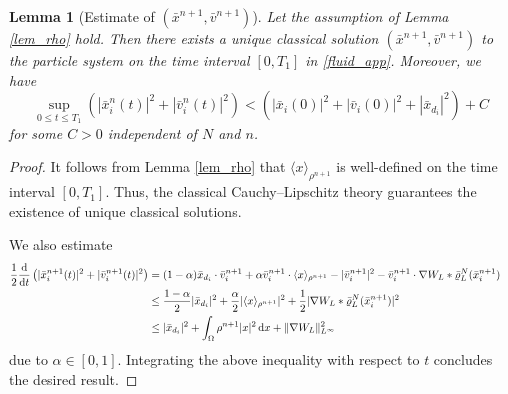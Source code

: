 \documentclass[10pt, reqno]{amsart}
\newtheorem{lemma}[theorem]{Lemma}
\theoremstyle{definition}
\theoremstyle{remark}
\numberwithin{equation}{section}
\newcommand{\dx}{\textnormal{d}x}
\newcommand{\ddt}{\frac{\textnormal{d}}{\textnormal{d}t}}
\newcommand{\calP}{\mathcal P}
\newcommand{\N}{\mathbb{N}}
\begin{document}
\begin{lemma}[Estimate of $(\bar x^{n+1}, \bar v^{n+1})$]\label{lem_par} Let the assumption of Lemma \ref{lem_rho} hold. Then there exists a unique classical solution $(\bar x^{n+1}, \bar v^{n+1})$ to the particle system on the time interval $[0,T_1]$ in \eqref{fluid_app}. Moreover, we have
\[
\sup_{0 \leq t \leq T_1} \left(| \bar x_i^n(t)|^2 + | \bar v_i^n(t)|^2 \right)  <  \left(| \bar x_i(0)|^2 + | \bar v_i(0)|^2 + |\bar{x}_{d_i}|^2 \right) + C
\]
for some $C>0$ independent of $N$ and $n$.
\end{lemma}
\begin{proof}It follows from Lemma \ref{lem_rho} that $\langle x \rangle_{\rho^{n+1}}$ is well-defined on the time interval $[0,T_1]$. Thus, the classical Cauchy--Lipschitz theory guarantees the existence of unique classical solutions. 

We also estimate
\begin{align*}
 \frac12\ddt \left(| \bar x_i^{n+1}(t)|^2 + | \bar v_i^{n+1}(t)|^2 \right) 
&  = (1-\alpha) \bar{x}_{d_i} \cdot  \bar v_i^{n+1}  + \alpha  \bar v_i^{n+1} \cdot \langle x \rangle_{\rho^{n+1}} -   |\bar v_i^{n+1}|^2 -   \bar v_i^{n+1} \cdot  \nabla W_L *  \bar\varrho_{L}^N(\bar{x}_i^{n+1})\cr
&  \leq  \frac{1-\alpha}{2}|\bar{x}_{d_i}|^2 + \frac{\alpha}2 | \langle x \rangle_{\rho^{n+1}}|^2 + \frac12  |\nabla W_L *  \bar\varrho_{L}^N(\bar{x}_i^{n+1})|^2 \cr
&  \leq |\bar{x}_{d_i}|^2 + \int_{\Omega} \rho^{n+1}|x|^2\,\dx + \|\nabla W_L\|_{L^\infty}^2
\end{align*}
due to $\alpha \in [0,1]$. Integrating the above inequality with respect to $t$ concludes the desired result.
\end{proof}
\end{document}
